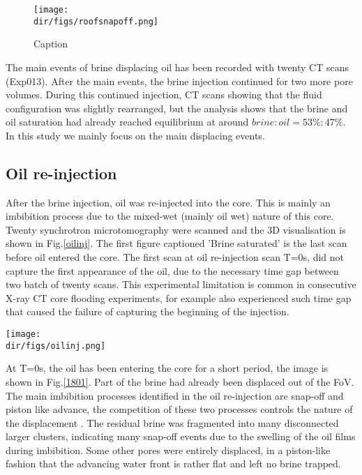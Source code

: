 \begin{figure}
    \centering
    \texttt{[image: \\dir/figs/roofsnapoff.png]}
    \caption{Caption}   
    \label{roofsnapoff}
\end{figure}

The main events of brine displacing oil has been recorded with twenty CT scans (Exp013). After the main events, the brine injection continued for two more pore volumes. During this continued injection, CT scans showing that the fluid configuration was slightly rearranged, but the analysis shows that the brine and oil saturation had already reached equilibrium at around $brine:oil=53\%:47\%$. In this study we mainly focus on the main displacing events.

\subsection{Oil re-injection}
After the brine injection, oil was re-injected into the core. This is mainly an imbibition process due to the mixed-wet (mainly oil wet) nature of this core. Twenty synchrotron microtomography were scanned and the 3D visualisation is shown in Fig.\ref{oilinj}. The first figure captioned 'Brine saturated' is the last scan before oil entered the core. The first scan at oil re-injection scan T=0s, did not capture the first appearance of the oil, due to the necessary time gap between two batch of twenty scans. This experimental limitation is common in consecutive X-ray CT core flooding experiments, for example \citet{khanamiri2018fluid} also experienced such time gap that caused the failure of capturing the beginning of the injection.

\begin{sidewaysfigure}
    \centering
    \texttt{[image: \\dir/figs/oilinj.png]}
    \caption{Caption}
    \label{oilinj}
\end{sidewaysfigure}

At T=0s, the oil has been entering the core for a short period, the image is shown in Fig.\ref{1801}. Part of the brine had already been displaced out of the FoV. The main imbibition processes identified in the oil re-injection are snap-off and piston like advance, the competition of these two processes controls the nature of the displacement \citep{blunt2017multiphase}. The residual brine was fragmented into many disconnected larger clusters, indicating many snap-off events due to the swelling of the oil films during imbibition. Some other pores were entirely displaced, in a piston-like fashion that the advancing water front is rather flat and left no brine trapped.

